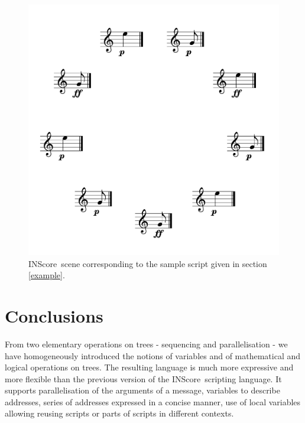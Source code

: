 \documentclass[runningheads]{llncs}
\newcommand{\IS}		{INScore}
\begin{document}
\begin{figure}[htbp]
\begin{center}
\includegraphics[width=0.63\columnwidth]{imgs/scene}
\caption{\IS\ scene corresponding to the sample script given in section \ref{example}.}
\label{samplescene}
\end{center}
\end{figure}


\section{Conclusions}
From two elementary operations on trees - sequencing and parallelisation - we have homogeneously introduced the notions of variables and of mathematical and logical operations on trees. The resulting language is much more expressive and more flexible than the  previous version of the \IS\ scripting language. 
It supports parallelisation of the arguments of a message, variables to describe addresses, series of addresses expressed in a concise manner, use of local variables allowing reusing scripts or parts of scripts in different contexts.



\balance


\end{document}
